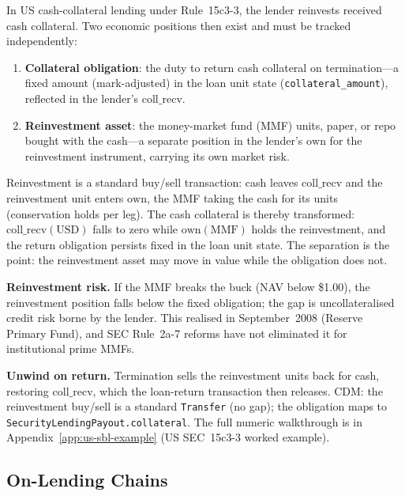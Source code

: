 In US cash-collateral lending under Rule~15c3-3, the lender reinvests received cash collateral. Two economic positions then exist and must be tracked independently:

\begin{enumerate}[nosep]
\item \textbf{Collateral obligation}: the duty to return cash collateral on termination---a fixed amount (mark-adjusted) in the loan unit state (\texttt{collateral\_amount}), reflected in the lender's $\mathrm{coll\_recv}$.
\item \textbf{Reinvestment asset}: the money-market fund (MMF) units, paper, or repo bought with the cash---a separate position in the lender's $\mathrm{own}$ for the reinvestment instrument, carrying its own market risk.
\end{enumerate}

Reinvestment is a standard buy/sell transaction: cash leaves $\mathrm{coll\_recv}$ and the reinvestment unit enters $\mathrm{own}$, the MMF taking the cash for its units (conservation holds per leg). The cash collateral is thereby transformed: $\mathrm{coll\_recv}(\text{USD})$ falls to zero while $\mathrm{own}(\text{MMF})$ holds the reinvestment, and the return obligation persists fixed in the loan unit state. The separation is the point: the reinvestment asset may move in value while the obligation does not.

\noindent\textbf{Reinvestment risk.} If the MMF breaks the buck (NAV below \$1.00), the reinvestment position falls below the fixed obligation; the gap is uncollateralised credit risk borne by the lender. This realised in September~2008 (Reserve Primary Fund), and SEC Rule~2a-7 reforms have not eliminated it for institutional prime MMFs.

\noindent\textbf{Unwind on return.} Termination sells the reinvestment units back for cash, restoring $\mathrm{coll\_recv}$, which the loan-return transaction then releases. CDM: the reinvestment buy/sell is a standard \texttt{Transfer} (no gap); the obligation maps to \texttt{SecurityLendingPayout.collateral}. The full numeric walkthrough is in Appendix~\ref{app:us-sbl-example} (US SEC~15c3-3 worked example).

\subsection{On-Lending Chains}
\label{sec:sbl-onlending}

